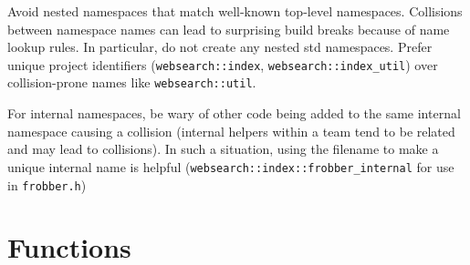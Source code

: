 \documentclass[12pt,reqno]{book}      %
\begin{document}
Avoid nested namespaces that match well-known top-level namespaces. Collisions between namespace names can lead to surprising build breaks because of name lookup rules. In particular, do not create any nested std namespaces. Prefer unique project identifiers (\texttt{websearch::index}, \texttt{websearch::index\_util}) over collision-prone names like \texttt{websearch::util}.

For internal namespaces, be wary of other code being added to the same internal namespace causing a collision (internal helpers within a team tend to be related and may lead to collisions). In such a situation, using the filename to make a unique internal name is helpful (\texttt{websearch::index::frobber\_internal} for use in \texttt{frobber.h})



\chapter{Functions}
\end{document}
